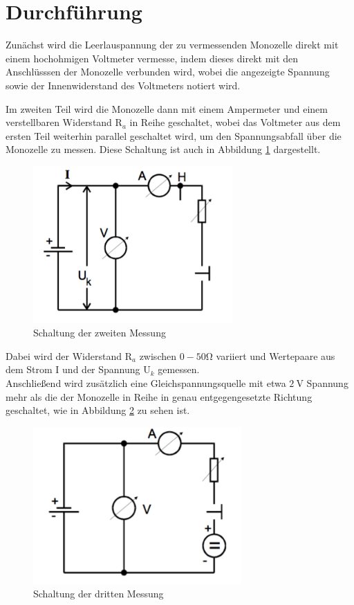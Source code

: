 \section{Durchführung}
Zunächst wird die Leerlauspannung der zu vermessenden Monozelle direkt mit einem
hochohmigen Voltmeter vermesse, indem dieses direkt mit den Anschlüsssen der Monozelle
verbunden wird, wobei die angezeigte Spannung sowie der Innenwiderstand des
Voltmeters notiert wird.


\noindent Im zweiten Teil wird die Monozelle dann mit einem Ampermeter und einem
verstellbaren Widerstand $\text{R}_a $ in Reihe geschaltet, wobei das Voltmeter
aus dem ersten Teil weiterhin parallel geschaltet wird, um den Spannungsabfall über
die Monozelle zu messen. Diese Schaltung ist auch in Abbildung \ref{fig:schalt2}
dargestellt.
\begin{figure}[H]
  \centering
  \includegraphics[height=6cm]{schalt2.png}
  \caption{Schaltung der zweiten Messung \cite{skript}}
  \label{fig:schalt2}
\end{figure}
\noindent Dabei wird der Widerstand $\text{R}_a $ zwischen $ 0 - 50 \si{\ohm}$ variiert
und Wertepaare aus dem Strom I und der Spannung $\text{U}_k $ gemessen. \\
\noindent Anschließend wird zusätzlich eine Gleichspannungsquelle mit etwa $\SI{2}{\volt}$
Spannung mehr als die der Monozelle in Reihe in genau entgegengesetzte Richtung
geschaltet, wie in Abbildung \ref{fig:schalt3} zu sehen ist.
\begin{figure}[H]
  \centering
  \includegraphics[height=6cm]{schalt3.png}
  \caption{Schaltung der dritten Messung \cite{skript} }
  \label{fig:schalt3}
\end{figure}
